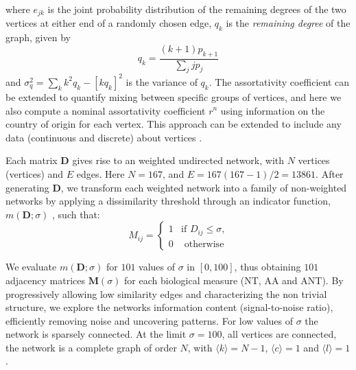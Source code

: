 \documentclass[12pt]{article}
\begin{document}
where $e_{jk}$ is the joint probability distribution of the remaining degrees of the two vertices at either end of a randomly chosen edge, $q_k$ is the \textit{remaining degree} of the graph, given by 
\begin{equation}
 \label{eq:remaining}
 q_k = \frac{(k+1)p_{k+1}}{\sum_jjp_j}
\end{equation}
 and $\sigma_{q}^{2}=\sum_{k}k^2q_k-[kq_k]^2$ is the variance of $q_k$. 
The assortativity coefficient can be extended to quantify mixing between specific groups of vertices, and here we also compute a nominal assortativity coefficient $r^{n}$ using information on the country of origin for each vertex.
This approach can be extended to include any data (continuous and discrete) about vertices \cite{assort}.

Each matrix $\mathbf{D}$ gives rise to an weighted undirected network, with $N$ vertices (vertices) and $E$ edges.
Here $N=167$, and $E=167(167-1)/2=13861$. After generating $\mathbf{D}$, we transform each weighted network into a family of non-weighted networks by applying a dissimilarity threshold through an indicator function, $m(\mathbf{D};\sigma)$ \cite{GoesNeto2010,Andrade2011}, such that:
\begin{equation}
M_{ij} =
\begin{cases} 
1 & \text{if $D_{ij} \leq \sigma$,}
 \\
0 & \text{ otherwise}
\end{cases}
\end{equation}

We evaluate $m(\mathbf{D};\sigma)$ for $101$ values of $\sigma$ in $[0,100]$, thus obtaining $101$ adjacency matrices $\mathbf{M}(\sigma)$ for each biological measure (NT, AA and ANT).
By progressively allowing low similarity edges and characterizing the non trivial structure, we explore the networks information content (signal-to-noise ratio), efficiently removing noise and uncovering patterns. For low values of $\sigma$ the network is sparsely connected. At the limit $\sigma=100$, all vertices are connected, the network is a complete graph of order $N$, with $\langle k \rangle=N-1$, $\langle c \rangle=1$ and $\langle l \rangle=1$.

 
\end{document}
